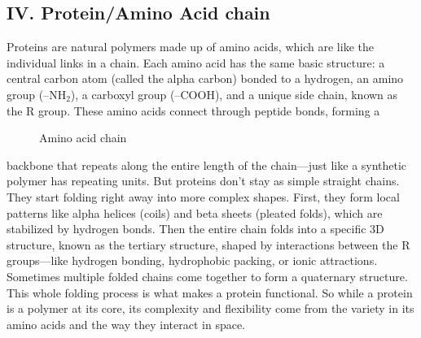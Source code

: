 \documentclass[12pt]{article}
\begin{document}
\begin{flushleft}
\subsection*{IV. Protein/Amino Acid chain}
Proteins are natural polymers made up of amino acids, which are like the individual links in a chain. Each amino acid has the same basic structure: a central carbon atom (called the alpha carbon) bonded to a hydrogen, an amino group (–NH$_2$), a carboxyl group (–COOH), and a unique side chain, known as the R group. These amino acids connect through peptide bonds, forming a 

\begin{figure}[!ht]
  \centering
  
  \caption{Amino acid chain}
\end{figure}

\noindent backbone that repeats along the entire length of the chain—just like a synthetic polymer has repeating units. But proteins don’t stay as simple straight chains. They start folding right away into more complex shapes. First, they form local patterns like alpha helices (coils) and beta sheets (pleated folds), which are stabilized by hydrogen bonds. Then the entire chain folds into a specific 3D structure, known as the tertiary structure, shaped by interactions between the R groups—like hydrogen bonding, hydrophobic packing, or ionic attractions. Sometimes multiple folded chains come together to form a quaternary structure. This whole folding process is what makes a protein functional. So while a protein is a polymer at its core, its complexity and flexibility come from the variety in its amino acids and the way they interact in space. 




\end{flushleft}
\end{document}
